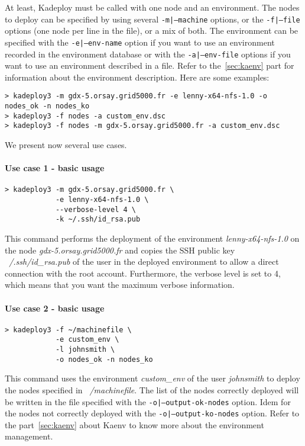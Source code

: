 \documentclass[a4wide,10pt,oneside]{book}
\begin{document}
\begin{small}
\begin{verbatim}
\end{verbatim}
\end{small}

At least, Kadeploy must be called with one node and an environment. The nodes to deploy can be specified by using several \texttt{-m|--machine} options, or the \texttt{-f|--file} options (one node per line in the file), or a mix of both.
The environment can be specified with the \texttt{-e|--env-name} option if you want to use an environment recorded in the environment database or with the \texttt{-a|--env-file} options if you want to use an environment described in a file. Refer to the~\ref{sec:kaenv} part for information about the environment description. Here are some examples:
\begin{verbatim}
> kadeploy3 -m gdx-5.orsay.grid5000.fr -e lenny-x64-nfs-1.0 -o nodes_ok -n nodes_ko
> kadeploy3 -f nodes -a custom_env.dsc
> kadeploy3 -f nodes -m gdx-5.orsay.grid5000.fr -a custom_env.dsc
\end{verbatim}

We present now several use cases.

\paragraph{Use case 1 - basic usage}
\begin{verbatim}
> kadeploy3 -m gdx-5.orsay.grid5000.fr \
            -e lenny-x64-nfs-1.0 \
            --verbose-level 4 \
            -k ~/.ssh/id_rsa.pub
\end{verbatim}
This command performs the deployment of the environment \textit{lenny-x64-nfs-1.0} on the node \textit{gdx-5.orsay.grid5000.fr} and copies the SSH public key \textit{~/.ssh/id\_rsa.pub} of the user in the deployed environment to allow a direct connection with the root account. Furthermore, the verbose level is set to 4, which means that you want the maximum verbose information.

\paragraph{Use case 2 - basic usage}
\begin{verbatim}
> kadeploy3 -f ~/machinefile \
            -e custom_env \
            -l johnsmith \
            -o nodes_ok -n nodes_ko
\end{verbatim}
This command uses the environment \textit{custom\_env} of the user \textit{johnsmith} to deploy the nodes specified in \textit{~/machinefile}. The list of the nodes correctly deployed will be written in the file specified with the \texttt{-o|--output-ok-nodes} option. Idem for the nodes not correctly deployed with the \texttt{-o|--output-ko-nodes} option. Refer to the part~\ref{sec:kaenv} about Kaenv to know more about the environment management.
\end{document}
